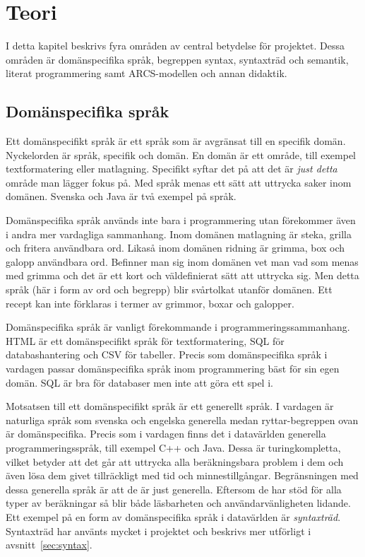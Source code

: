 
\chapter{Teori}

\begin{draft}

I detta kapitel beskrivs fyra områden av central betydelse för projektet. Dessa
områden är domänspecifika språk, begreppen syntax, syntaxträd och semantik,
literat programmering samt ARCS-modellen och annan didaktik.

\section{Domänspecifika språk}

Ett domänspecifikt språk är ett språk som är avgränsat till en specifik domän.
Nyckelorden är språk, specifik och domän. En domän är ett område, till exempel
textformatering eller matlagning. Specifikt syftar det på att det är \textit{just
detta} område man lägger fokus på. Med språk menas ett sätt att uttrycka
saker inom domänen. Svenska och Java är två exempel på språk.

Domänspecifika språk används inte bara i programmering utan förekommer även i
andra mer vardagliga sammanhang. Inom domänen matlagning är steka, grilla och
fritera användbara ord. Likaså inom domänen ridning är grimma, box och galopp
användbara ord. Befinner man sig inom domänen vet man vad som menas med grimma
och det är ett kort och väldefinierat sätt att uttrycka sig. Men detta språk (här
i form av ord och begrepp) blir svårtolkat utanför domänen. Ett recept kan inte
förklaras i termer av grimmor, boxar och galopper.

Domänspecifika språk är vanligt förekommande i programmeringssammanhang. HTML är
ett domänspecifikt språk för textformatering, SQL för databashantering och
CSV för tabeller. Precis som domänspecifika språk i vardagen passar
domänspecifika språk inom programmering bäst för sin egen domän. SQL är bra för
databaser men inte att göra ett spel i.

Motsatsen till ett domänspecifikt språk är ett generellt språk. I vardagen är
naturliga språk som svenska och engelska generella medan ryttar-begreppen ovan
är domänspecifika. Precis som i vardagen finns det i datavärlden generella
programmeringsspråk, till exempel C++ och Java. Dessa är turingkompletta, vilket betyder
att det går att uttrycka alla beräkningsbara problem i dem och även lösa dem
givet tillräckligt med tid och
minnestillgångar\cite{turing_ne}\cite{turing_book}. Begränsningen med dessa
generella språk är att de är just generella. Eftersom de har stöd för
alla typer av beräkningar så blir både läsbarheten och användarvänligheten
lidande. Ett exempel på en form av domänspecifika språk i datavärlden är \textit{syntaxträd}. Syntaxträd har
använts mycket i projektet och beskrivs mer utförligt i
avsnitt~\ref{sec:syntax}.


\end{draft}
